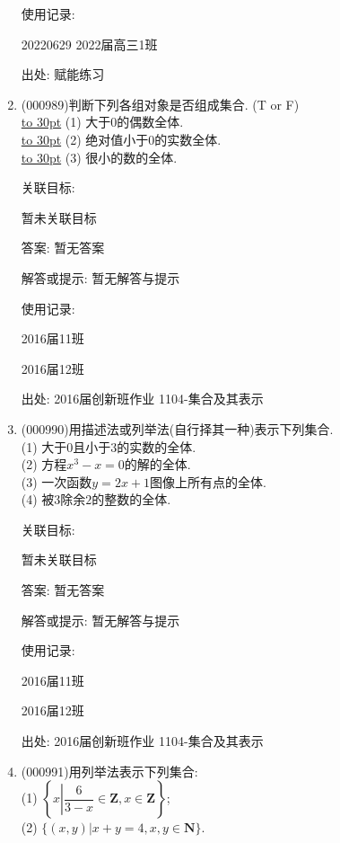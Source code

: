 \documentclass[10pt,a4paper]{article}
\newcommand{\blank}[1]{\underline{\hbox to #1pt{}}}
\begin{document}
\begin{enumerate}[1.]
使用记录:

20220629    2022届高三1班  	


出处: 赋能练习
\item { (000989)}判断下列各组对象是否组成集合. (T or F)\\ 
\blank{30} (1) 大于$0$的偶数全体.\\ 
\blank{30} (2) 绝对值小于$0$的实数全体.\\ 
\blank{30} (3) 很小的数的全体.


关联目标:

暂未关联目标

答案: 暂无答案

解答或提示: 暂无解答与提示

使用记录:

2016届11班			

2016届12班			


出处: 2016届创新班作业	1104-集合及其表示
\item { (000990)}用描述法或列举法(自行择其一种)表示下列集合.\\ 
(1) 大于$0$且小于$3$的实数的全体.\\ 
(2) 方程$x^3-x=0$的解的全体.\\ 
(3) 一次函数$y=2x+1$图像上所有点的全体.\\ 
(4) 被$3$除余$2$的整数的全体.


关联目标:

暂未关联目标

答案: 暂无答案

解答或提示: 暂无解答与提示

使用记录:

2016届11班				

2016届12班				


出处: 2016届创新班作业	1104-集合及其表示
\item { (000991)}用列举法表示下列集合:\\ 
(1) $\left\{x\left| \dfrac{6}{3-x}\in\mathbf{Z},x\in\mathbf{Z}\right.\right\}$;\\ 
(2) $\{(x,y)|x+y=4,x,y\in\mathbf{N}\}$.



\end{enumerate}
\end{document}
